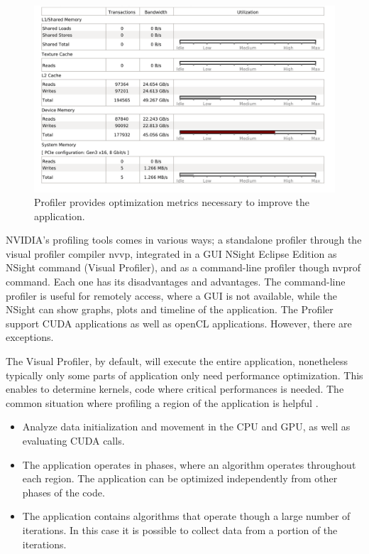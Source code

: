 \begin{figure}[htbp]
	\centering
		\includegraphics[width=1.0\textwidth]{Figures/visualgraph.png}
		\smallskip
	\caption[Visual Profiler metrics]{Profiler provides optimization metrics necessary to improve the application.}
	\label{fig:visualgraph}
\end{figure}

NVIDIA's profiling tools comes in various ways; a standalone profiler through the visual profiler compiler nvvp, integrated in a GUI NSight Eclipse Edition as NSight command (Visual Profiler), and as a command-line profiler though nvprof command. Each one has its disadvantages and advantages. The command-line profiler is useful for remotely access, where a GUI is not available, while the NSight can show graphs, plots and timeline of the application. The Profiler support CUDA applications as well as openCL applications. However, there are exceptions. 

The Visual Profiler, by default, will execute the entire application, nonetheless typically only some parts of application only need performance optimization. This enables to determine kernels, code where critical performances is needed. The common situation where profiling a region of the application is helpful \cite{tool}.

\begin{itemize}
  \item Analyze data initialization and movement in the CPU and GPU, as well as evaluating CUDA calls.
  \item The application operates in phases, where an algorithm operates throughout each region. The application can be optimized independently from other phases of the code.
  \item The application contains algorithms that operate though a large number of iterations. In this case it is possible to collect data from a portion of the iterations.
\end{itemize}

